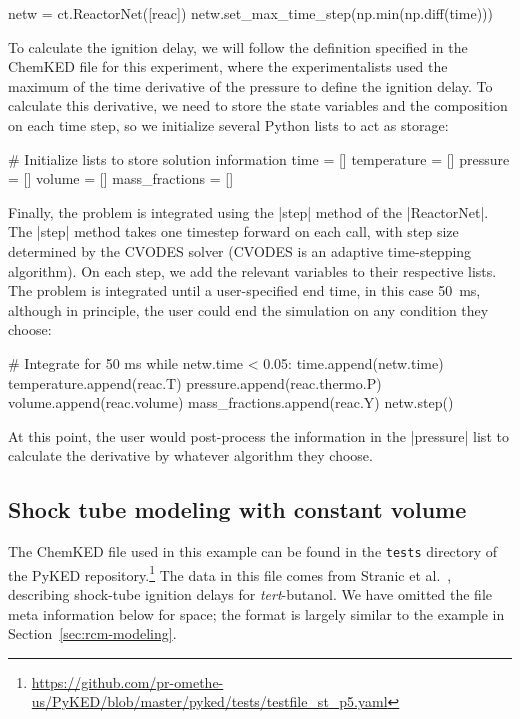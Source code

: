 \documentclass[12pt]{ijck}
\newcommand\ck{ChemKED}
\newcommand\pk{PyKED}
\begin{document}
\begin{pythonbox}
netw = ct.ReactorNet([reac])
netw.set_max_time_step(np.min(np.diff(time)))
\end{pythonbox}

To calculate the ignition delay, we will follow the definition specified in the ChemKED file for
this experiment, where the experimentalists used the maximum of the time derivative of the pressure
to define the ignition delay. To calculate this derivative, we need to store the state variables and the composition on each time step, so we initialize several Python lists to act as storage:

\begin{pythonbox}
# Initialize lists to store solution information
time = []
temperature = []
pressure = []
volume = []
mass_fractions = []
\end{pythonbox}

Finally, the problem is integrated using the \pybox|step| method of the \pybox|ReactorNet|. The
\pybox|step| method takes one timestep forward on each call, with step size determined by the CVODES
solver (CVODES is an adaptive time-stepping algorithm). On each step, we add the relevant variables
to their respective lists. The problem is integrated until a user-specified end time, in this case
\SI{50}{\milli\second}, although in principle, the user could end the simulation on any condition
they choose:

\begin{pythonbox}
# Integrate for 50 ms
while netw.time < 0.05:
    time.append(netw.time)
    temperature.append(reac.T)
    pressure.append(reac.thermo.P)
    volume.append(reac.volume)
    mass_fractions.append(reac.Y)
    netw.step()
\end{pythonbox}

At this point, the user would post-process the information in the \pybox|pressure| list to calculate
the derivative by whatever algorithm they choose.

\subsection{Shock tube modeling with constant volume}\label{sec:shock-tube}

The \ck{} file used in this example can be found in the \texttt{tests} directory of the \pk{}
repository.\footnote{\url{https://github.com/pr-omethe-us/PyKED/blob/master/pyked/tests/testfile_st_p5.yaml}}
The data in this file comes from Stranic et al.~\autocite{Stranic:2012}, describing
shock-tube ignition delays for \textit{tert}-butanol. We have omitted the file
meta information below for space; the format is largely similar to the example in
Section~\ref{sec:rcm-modeling}.
\end{document}

